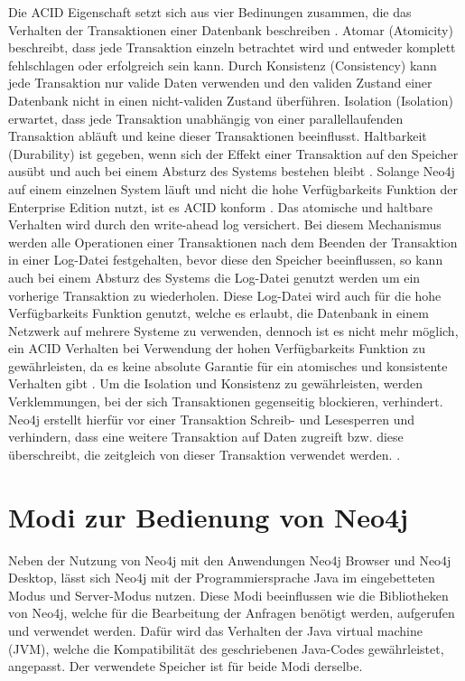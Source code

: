 Die ACID Eigenschaft setzt sich aus vier Bedinungen zusammen, die das Verhalten der Transaktionen einer  Datenbank beschreiben \parencite{haerder1983principles}. Atomar (Atomicity) beschreibt, dass jede Transaktion einzeln betrachtet wird und entweder komplett fehlschlagen oder erfolgreich sein kann. Durch Konsistenz (Consistency) kann jede Transaktion nur valide Daten verwenden und den validen Zustand einer Datenbank nicht in einen nicht-validen Zustand überführen. Isolation (Isolation) erwartet, dass jede Transaktion unabhängig von einer parallellaufenden Transaktion abläuft und keine dieser Transaktionen beeinflusst. Haltbarkeit (Durability) ist gegeben, wenn sich der Effekt einer Transaktion auf den Speicher ausübt und auch bei einem Absturz des Systems bestehen bleibt \parencite{haerder1983principles}. \newline Solange Neo4j auf einem einzelnen System läuft und nicht die hohe Verfügbarkeits Funktion der Enterprise Edition nutzt, ist es ACID konform \parencite{holzschuher2013performance}. Das atomische und haltbare Verhalten wird durch den write-ahead log versichert. Bei diesem Mechanismus  werden alle Operationen einer Transaktionen nach dem Beenden der Transaktion in einer Log-Datei  festgehalten, bevor diese  den Speicher beeinflussen, so kann auch bei einem Absturz des Systems die Log-Datei genutzt werden um ein vorherige Transaktion zu wiederholen. Diese Log-Datei wird auch für die  hohe Verfügbarkeits Funktion genutzt, welche es erlaubt, die Datenbank in einem Netzwerk auf mehrere Systeme zu verwenden, dennoch ist es nicht mehr möglich, ein  ACID Verhalten bei Verwendung der hohen Verfügbarkeits Funktion zu gewährleisten, da es keine absolute Garantie für ein  atomisches und konsistente Verhalten gibt \parencite{vukotic2015neo4j}. Um die Isolation und Konsistenz zu gewährleisten, werden Verklemmungen, bei der sich Transaktionen gegenseitig blockieren, verhindert. Neo4j erstellt hierfür vor einer Transaktion Schreib- und Lesesperren und verhindern, dass eine weitere Transaktion auf Daten zugreift bzw. diese überschreibt, die zeitgleich von dieser Transaktion verwendet werden. \parencite{raj2015neo4j}.
\section {Modi zur Bedienung von Neo4j}
Neben der Nutzung von Neo4j mit den Anwendungen Neo4j  Browser und Neo4j Desktop, lässt sich Neo4j mit der Programmiersprache Java im eingebetteten Modus und Server-Modus nutzen. Diese Modi beeinflussen wie die Bibliotheken von Neo4j, welche für die Bearbeitung der Anfragen benötigt werden, aufgerufen und verwendet werden. Dafür wird das Verhalten der Java virtual machine (JVM), welche die Kompatibilität des geschriebenen Java-Codes gewährleistet, angepasst. Der verwendete Speicher ist für beide Modi derselbe.

